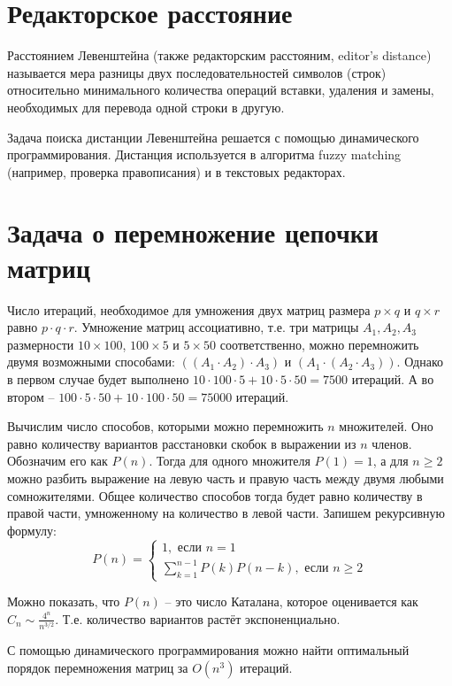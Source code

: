 \documentclass[a4paper,11pt]{article}
\begin{document}
\section{Редакторское расстояние}
Расстоянием Левенштейна (также редакторским расстояним, editor's distance)
называется мера разницы двух последовательностей символов (строк)
относительно минимального количества операций вставки, удаления и замены,
необходимых для перевода одной строки в другую.

Задача поиска дистанции Левенштейна решается с помощью динамического
программирования. Дистанция используется в алгоритма fuzzy matching
(например, проверка правописания) и в текстовых редакторах.

\section{Задача о перемножение цепочки матриц}
Число итераций, необходимое для умножения двух матриц размера $p \times q$
и $q \times r$ равно $p \cdot q \cdot r$. Умножение матриц ассоциативно,
т.е. три матрицы $A_1, A_2, A_3$ размерности
$10 \times 100$, $100 \times 5$ и $5 \times 50$ соответственно, можно
перемножить двумя возможными способами: $((A_1 \cdot A_2) \cdot A_3)$ и
$(A_1 \cdot (A_2 \cdot A_3))$. Однако в первом случае будет выполнено 
$10 \cdot 100 \cdot 5 + 10 \cdot 5 \cdot 50 = 7500$ итераций. А во втором
-- $100 \cdot 5 \cdot 50 + 10 \cdot 100 \cdot 50 = 75000$ итераций.

Вычислим число способов, которыми можно перемножить $n$ множителей. Оно
равно количеству вариантов расстановки скобок в выражении из $n$ членов.
Обозначим его как $P(n)$. Тогда для одного множителя $P(1) = 1$, а для 
$n \geqslant 2$ можно разбить выражение на левую часть и правую часть
между двумя любыми сомножителями. Общее количество способов тогда 
будет равно количеству в правой части, умноженному на количество в левой
части. Запишем рекурсивную формулу:
\begin{equation*}
  P(n) = \begin{cases}
    1, \text{ если } n = 1 \\
    \sum_{k=1}^{n-1} P(k) P(n-k), \text{ если } n \geqslant 2
    \end{cases}
\end{equation*}

Можно показать, что $P(n)$ -- это число Каталана, которое оценивается как
$C_n \sim \frac{4^n}{n^{3/2}}$. Т.е. количество вариантов растёт
экспоненциально.

С помощью динамического программирования можно найти оптимальный порядок
перемножения матриц за $O(n^3)$ итераций.
\end{document}

